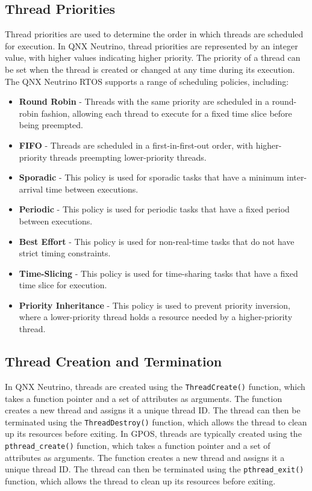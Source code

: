 \documentclass{article}
\begin{document}
\subsection{Thread Priorities}
\label{sec:thread-priorities}
Thread priorities are used to determine the order in which threads are scheduled for execution.
In QNX Neutrino, thread priorities are represented by an integer value, with higher values indicating higher priority.
The priority of a thread can be set when the thread is created or changed at any time during its execution.
The QNX Neutrino RTOS supports a range of scheduling policies, including:
\begin{itemize}
	\item  \textbf{Round Robin} - Threads with the same priority are scheduled in a round-robin fashion, allowing each thread to execute for a fixed time slice before being preempted.
	\item  \textbf{FIFO} - Threads are scheduled in a first-in-first-out order, with higher-priority threads preempting lower-priority threads.
	\item  \textbf{Sporadic} - This policy is used for sporadic tasks that have a minimum inter-arrival time between executions.
	\item  \textbf{Periodic} - This policy is used for periodic tasks that have a fixed period between executions.
	\item \textbf{Best Effort} - This policy is used for non-real-time tasks that do not have strict timing constraints.
	\item \textbf{Time-Slicing} - This policy is used for time-sharing tasks that have a fixed time slice for execution.
	\item \textbf{Priority Inheritance} - This policy is used to prevent priority inversion, where a lower-priority thread holds a resource needed by a higher-priority thread.
\end{itemize} \cite{ThreadPriority}

\subsection{Thread Creation and Termination}
\label{sec:thread-creation}
In QNX Neutrino, threads are created using the \texttt{ThreadCreate()} function, which takes a function pointer and a set of attributes as arguments.
The function creates a new thread and assigns it a unique thread ID.
The thread can then be terminated using the \texttt{ThreadDestroy()} function, which allows the thread to clean up its resources before exiting.
In GPOS, threads are typically created using the \texttt{pthread\_create()} function, which takes a function pointer and a set of attributes as arguments.
The function creates a new thread and assigns it a unique thread ID.
The thread can then be terminated using the \texttt{pthread\_exit()} function, which allows the thread to clean up its resources before exiting.\cite{ThreadsAndProcesses}
\end{document}
